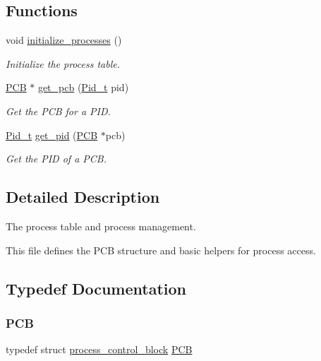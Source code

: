 \subsection*{Functions}
\begin{DoxyCompactItemize}
\item 
void \hyperlink{group__proc_ga82948cbeb57bb0b6e15d1f14f06a2db3}{initialize\+\_\+processes} ()
\begin{DoxyCompactList}\small\item\em Initialize the process table. \end{DoxyCompactList}\item 
\hyperlink{group__proc_gadf327f09ee935cf1734c14e8849f0421}{P\+CB} $\ast$ \hyperlink{group__proc_ga10cf45ea8bc92b00bd1f25553b9cf5c8}{get\+\_\+pcb} (\hyperlink{group__syscalls_gafac07f3170763932fac97b6eab2c3984}{Pid\+\_\+t} pid)
\begin{DoxyCompactList}\small\item\em Get the P\+CB for a P\+ID. \end{DoxyCompactList}\item 
\hyperlink{group__syscalls_gafac07f3170763932fac97b6eab2c3984}{Pid\+\_\+t} \hyperlink{group__proc_ga110e884cb053244b18d1058751a78cfe}{get\+\_\+pid} (\hyperlink{group__proc_gadf327f09ee935cf1734c14e8849f0421}{P\+CB} $\ast$pcb)
\begin{DoxyCompactList}\small\item\em Get the P\+ID of a P\+CB. \end{DoxyCompactList}\end{DoxyCompactItemize}


\subsection{Detailed Description}
The process table and process management. 

This file defines the P\+CB structure and basic helpers for process access. 

\subsection{Typedef Documentation}
\mbox{\label{group__proc_gadf327f09ee935cf1734c14e8849f0421}} 
\subsubsection{\texorpdfstring{P\+CB}{PCB}}
{\footnotesize\ttfamily typedef struct \hyperlink{structprocess__control__block}{process\+\_\+control\+\_\+block}  \hyperlink{group__proc_gadf327f09ee935cf1734c14e8849f0421}{P\+CB}}



